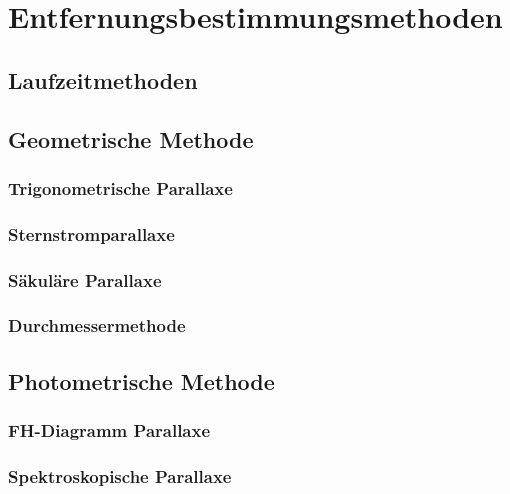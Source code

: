 \chapter{Entfernungsbestimmungsmethoden}
\section{Laufzeitmethoden}
\section{Geometrische Methode}
\subsection{Trigonometrische Parallaxe}
\subsection{Sternstromparallaxe}
\subsection{Säkuläre Parallaxe}
\subsection{Durchmessermethode}
\section{Photometrische Methode}
\subsection{FH-Diagramm Parallaxe}
\subsection{Spektroskopische Parallaxe}
